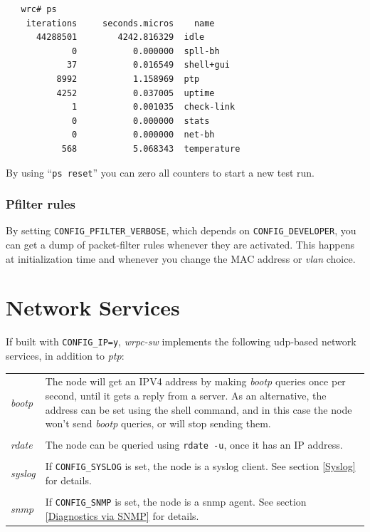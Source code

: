 \documentclass[a4paper, 12pt]{article}
\begin{document}
\begin{lstlisting}
   wrc# ps
    iterations     seconds.micros    name
      44288501        4242.816329  idle
             0           0.000000  spll-bh
            37           0.016549  shell+gui
          8992           1.158969  ptp
          4252           0.037005  uptime
             1           0.001035  check-link
             0           0.000000  stats
             0           0.000000  net-bh
           568           5.068343  temperature
\end{lstlisting}

By using ``\texttt{ps reset}'' you can zero all counters to start a new
test run.

\subsubsection{Pfilter rules}
\label{Pfilter rules}

By setting \texttt{CONFIG\_PFILTER\_VERBOSE}, which depends on
\texttt{CONFIG\_DEVELOPER}, you can get a dump of packet-filter rules
whenever they are activated.  This happens at initialization time and
whenever you change the MAC address or \textit{vlan} choice.

\newpage
\section{Network Services}
\label{Network Services}

If built with \texttt{CONFIG\_IP=y}, \textit{wrpc-sw} implements the following
udp-based network services, in addition to \textit{ptp}:

\begin{longtable}{  p{6.5cm}  p{9cm} }

\textit{ bootp } &

	The node will get an IPV4 address by making \textit{bootp} queries
        once per second, until it gets a reply from a server. As an
        alternative, the address can be set using the shell command,
        and in this case the node won't send \textit{bootp} queries, or will
        stop sending them.\\
& \\
\textit{ rdate } &

	The node can be queried using \texttt{rdate -u}, once it has an IP
        address.\\
& \\
\textit{ syslog } &

	If \texttt{CONFIG\_SYSLOG} is set, the node is a syslog client.
        See section \ref{Syslog} for details.\\
& \\
\textit{ snmp } &

	If \texttt{CONFIG\_SNMP} is set, the node is a snmp agent.
        See section \ref{Diagnostics via SNMP} for details.\\

\end{longtable}
\end{document}

